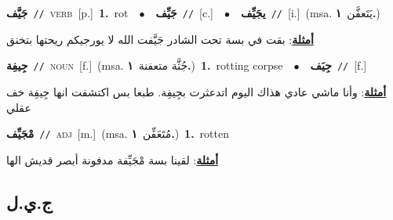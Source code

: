 \documentclass[10pt,a4paper,twoside]{article} %
\begin{document}
\begin{multicols}{2}
{\setlength\topsep{0pt}\textbf{\foreignlanguage{arabic}{جَيَّف}}\ {\color{gray}\texttt{//}\color{black}}\ \textsc{verb}\ [p.]\ \textbf{1.}~rot\ \ $\bullet$\ \ \setlength\topsep{0pt}\textbf{\foreignlanguage{arabic}{جَيِّف}}\ {\color{gray}\texttt{//}\color{black}}\ [c.]\ \ $\bullet$\ \ \setlength\topsep{0pt}\textbf{\foreignlanguage{arabic}{يجَيِّف}}\ {\color{gray}\texttt{//}\color{black}}\ [i.]\ \color{gray}(msa. \foreignlanguage{arabic}{يَتَعفَّن}~\foreignlanguage{arabic}{\textbf{١.}})\color{black}\  \begin{flushright}\color{gray}\foreignlanguage{arabic}{\textbf{\underline{\foreignlanguage{arabic}{أمثلة}}}: بقت في بسة تحت الشادر جَيَّفت الله لا يورجيكم ريحتها بتخنق}\end{flushright}\color{black}} \vspace{2mm}

{\setlength\topsep{0pt}\textbf{\foreignlanguage{arabic}{جِيفِة}}\ {\color{gray}\texttt{//}\color{black}}\ \textsc{noun}\ [f.]\ \color{gray}(msa. \foreignlanguage{arabic}{جُثَّة متعفنة}~\foreignlanguage{arabic}{\textbf{١.}})\color{black}\ \textbf{1.}~rotting corpse\ \ $\bullet$\ \ \setlength\topsep{0pt}\textbf{\foreignlanguage{arabic}{جِيَف}}\ {\color{gray}\texttt{//}\color{black}}\ [f.]\  \begin{flushright}\color{gray}\foreignlanguage{arabic}{\textbf{\underline{\foreignlanguage{arabic}{أمثلة}}}: وأنا ماشي عادي هذاك اليوم اتدعثرت بجِيفِة. طبعا بس اكتشفت انها جِيفِة خف عقلي}\end{flushright}\color{black}} \vspace{2mm}

{\setlength\topsep{0pt}\textbf{\foreignlanguage{arabic}{مْجَيِّف}}\ {\color{gray}\texttt{//}\color{black}}\ \textsc{adj}\ [m.]\ \color{gray}(msa. \foreignlanguage{arabic}{مُتَعَفِّن}~\foreignlanguage{arabic}{\textbf{١.}})\color{black}\ \textbf{1.}~rotten\  \begin{flushright}\color{gray}\foreignlanguage{arabic}{\textbf{\underline{\foreignlanguage{arabic}{أمثلة}}}: لقينا بسة مْجَيِّفة مدفونة أبصر قديش الها}\end{flushright}\color{black}} \vspace{2mm}

\vspace{-3mm}
\subsection*{\color{blue}\foreignlanguage{arabic}{ج.ي.ل}\color{blue}{}} 


\end{multicols}
\end{document}
